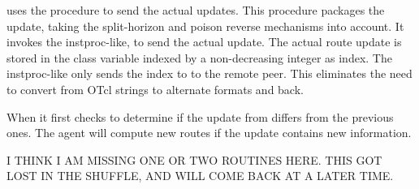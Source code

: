  uses the procedure
to send the actual updates.
This procedure packages the update, taking the
split-horizon and poison reverse mechanisms into account.
It invokes the instproc-like,
to send the actual update.
The actual route update is stored in the class variable
 indexed by a non-decreasing integer as index.
The instproc-like only sends the index to  to the remote peer.
This eliminates the need to convert from OTcl strings to alternate formats
and back.

When 
it first checks to determine if the update from differs from the previous
ones.
The agent will compute new routes if the update contains new information.


I THINK I AM MISSING ONE OR TWO ROUTINES HERE.
THIS GOT LOST IN THE SHUFFLE, AND WILL COME BACK AT A LATER TIME.

\endinput

### Local Variables:
### mode: latex
### comment-column: 60
### backup-by-copying-when-linked: t
### file-precious-flag: nil
### End:
